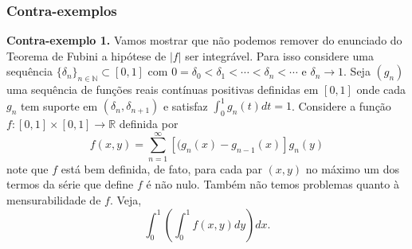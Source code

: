 \subsubsection{Contra-exemplos}


\noindent\textbf{Contra-exemplo 1.} 
Vamos mostrar que não podemos remover do enunciado do 
Teorema de Fubini a hipótese de $|f|$ ser integrável. 
Para isso considere uma sequência 
$\{\delta_n\}_{n\in\mathbb{N} }\subset [0,1]$ 
com $0=\delta_0<\delta_1<\cdots <\delta_n<\cdots $ 
e $\delta_n\to 1$. 
Seja $(g_n)$ uma sequência de funções reais 
contínuas positivas 
definidas em $[0,1]$ onde cada $g_n$ 
tem suporte em $(\delta_n,\delta_{n+1})$ e satisfaz 
$\int_{0}^{1}g_n(t)dt=1$. 
Considere a função  $f:[0,1]\times [0,1]\to \mathbb{R}$
definida por
$$
f(x,y)=\sum_{n=1}^{\infty}[(g_n(x)-g_{n-1}(x)]g_n(y)
$$
note que $f$ está bem definida, de fato, 
para cada par $(x,y)$ no máximo um dos termos da 
série que define $f$ é não nulo. 
Também não temos problemas quanto à 
mensurabilidade de $f$. Veja, 
$$
\int_{0}^1(\int_{0}^{1}f(x,y)dy)dx.
$$
